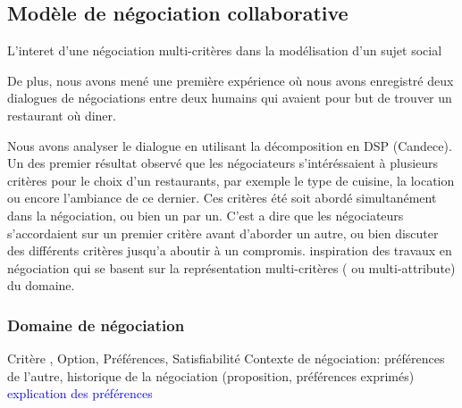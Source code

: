 
	

	\subsection{Modèle de négociation collaborative}
	

	L'interet d'une négociation multi-critères dans la modélisation d'un sujet social
	
	De plus, nous avons mené une première expérience où nous avons enregistré deux dialogues de négociations entre deux humains qui avaient pour but de trouver un restaurant où diner.
	
	Nous avons analyser le dialogue en utilisant la décomposition en DSP (Candece). Un des premier résultat observé que les négociateurs s'intéréssaient à plusieurs critères pour le choix d'un restaurants, par exemple le type de cuisine, la location ou encore l'ambiance de ce dernier. Ces critères été soit abordé simultanément dans la négociation, ou bien un par un. C'est a dire que les négociateurs s'accordaient sur un premier critère avant d'aborder un autre, ou bien discuter des différents critères jusqu'a aboutir à un compromis.
		inspiration des travaux en négociation qui se basent sur la représentation multi-critères ( ou multi-attribute) du domaine.
		
\subsubsection{Domaine de négociation }
Critère , Option, Préférences, Satisfiabilité
Contexte de négociation: préférences de l'autre, historique de la négociation (proposition, préférences exprimés)
\textcolor{blue}{explication des préférences}

